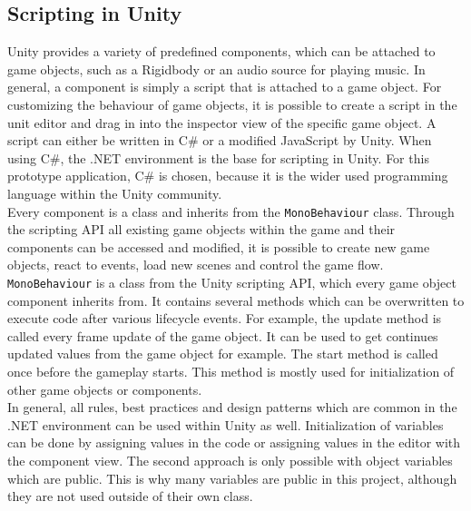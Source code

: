 \subsection{Scripting in Unity}
Unity provides a variety of predefined components, which can be attached to game objects, such as a Rigidbody or an audio source for playing music. In general, a component is simply a script that is attached to a game object. For customizing the behaviour of game objects, it is possible to create a script in the unit editor and drag in into the inspector view of the specific game object.  A script can either be written in C\# or a  modified JavaScript by Unity. When using C\#, the .NET environment is the base for scripting in Unity. For this prototype application, C\# is chosen, because it is the wider used programming language within the Unity community. \\
Every component is a class and inherits from the \texttt{MonoBehaviour} class. Through the scripting API all existing game objects within the game and their components can be accessed and modified, it is possible to create new game objects, react to events, load new scenes and control the game flow.
\texttt{MonoBehaviour} is a class from the Unity scripting API, which every game object component inherits from. It contains several methods which can be overwritten to execute code after various lifecycle events. For example, the update method is called every frame update of the game object. It can be used  to get continues updated values from the game object for example. The start method is called once before the gameplay starts. This method is mostly used for initialization of other game objects or components. \cite{unity.20192}\\
In general, all rules, best practices and design patterns which are common in the .NET environment can be used within Unity as well. Initialization of variables can be done by assigning values in the code or assigning values in the editor with the component view. The second approach is only possible with object variables which are public. This is why many variables are public in this project, although they are not used outside of their own class.

